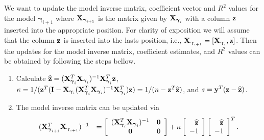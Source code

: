 \documentclass[12pt]{article}
\def\vectorfontone{\bf}
\def\vectorfonttwo{\boldsymbol}
\def\vy{{\vectorfontone y}}                      %
\def\vz{{\vectorfontone z}}                      %
\def\vzero{{\vectorfontone 0}}
\def\vgamma{{\vectorfonttwo \gamma}}             %
\def\matrixfontone{\bf}
\def\mI{{\matrixfontone I}}                      %
\def\mX{{\matrixfontone X}}                      %
\def\ds{\displaystyle}
\begin{document}
We want to update the model inverse matrix, coefficient vector and $R^2$ values for the model $\vgamma_{i+1}$ where $\mX_{\vgamma_{i+1}}$ is the matrix given by $\mX_{\vgamma_i}$ with a column $\vz$ inserted into the appropriate position.
For clarity of exposition we will assume that the column $\vz$ is inserted into the lasts position, i.e., $\mX_{\vgamma_{i+1}} = [\mX_{\vgamma_{i}},\vz]$.
Then the updates for the model inverse matrix, coefficient estimates, and $R^2$ values can be obtained by following the steps bellow.
\begin{enumerate}
	\item Calculate $\widehat{\vz} = (\mX_{\vgamma_i}^T\mX_{\vgamma_i})^{-1}\mX_{\vgamma_i}^T\vz$, 
	$\kappa 
	= 
	1/(\vz^T(\mI - \mX_{\vgamma_i}(\mX_{\vgamma_i}^T\mX_{\vgamma_i})^{-1}\mX_{\vgamma_i}^T)\vz) 
	= 1/(n - \vz^T\widehat{\vz})$, and  $s = \vy^T(\vz - \widehat{\vz})$.
	
	\item The model inverse matrix can be updated via  
	$$
	\begin{array}{rl}
	(\mX_{\vgamma_{i+1}}^T\mX_{\vgamma_{i+1}})^{-1}
	&\ds = 
	\left[ \begin{array}{cc}
	(\mX_{\vgamma_{i}}^T\mX_{\vgamma_{i}})^{-1}    & \vzero \\
	\vzero             
	& 0
	\end{array} \right] + \kappa \left[ \begin{array}{r}
	\widehat{\vz} \\
	-1 \\
	\end{array} \right] \left[ \begin{array}{r}
	\widehat{\vz} \\
	-1 \\
	\end{array} \right]^T.
	\end{array} 
	$$
	

\end{enumerate}
\end{document}

